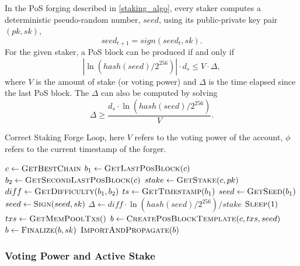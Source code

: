 \documentclass[a4paper]{article}
\begin{document}
In the PoS forging described in \cref{staking_algo}, every staker computes a deterministic pseudo-random number, $seed$, using its public-private key pair $(pk, sk)$,
\begin{equation}
seed_{t + 1} = sign(seed_t, sk).
\end{equation}
For the given staker, a PoS block can be produced if and only if
\begin{equation}
|\ln({hash(seed)}/{2^{256}})| \cdot d_s \leq V \cdot \Delta,
\end{equation}
where $V$ is the amount of stake (or voting power) and $\Delta$ is the time elapsed since the last PoS block. The $\Delta$ can also be computed by solving
\begin{equation}
\Delta \geq \frac{d_s \cdot \ln(hash(seed)/2^{256})}{V}.
\end{equation}

\begin{algorithm}
    \caption{Correct Staking Forge Loop, here $V$ refers to the voting power of the account, $\phi$ refers to the current timestamp of the forger.}
    \label{staking_algo}
    \begin{algorithmic}[1]
        \State $c     \gets \Call{GetBestChain}{}$
        \State $b_1   \gets \Call{GetLastPosBlock}{c}$
        \State $b_2   \gets \Call{GetSecondLastPosBlock}{c}$
        \State $stake \gets \Call{GetStake}{c, pk}$
        \State $diff  \gets \Call{GetDifficulty}{b_1, b_2}$
        \State $ts    \gets \Call{GetTimestamp}{b_1}$
        \State $seed  \gets \Call{GetSeed}{b_1}$
        \State $seed  \gets \Call{Sign}{seed, sk}$
        \State $\Delta \gets diff \cdot \ln(hash(seed)/2^{256}) / stake$
        \Do
            \State $\Call{Sleep}{1}$
        \State $txs \gets \Call{GetMemPoolTxs}$
        \State $b \gets \Call{CreatePosBlockTemplate}{c, txs, seed}$
        \State $b \gets \Call{Finalize}{b, sk}$
        \State $\Call{ImportAndPropagate}{b}$
        \EndProcedure
    \end{algorithmic}
\end{algorithm}

\subsubsection{Voting Power and Active Stake}
\end{document}
